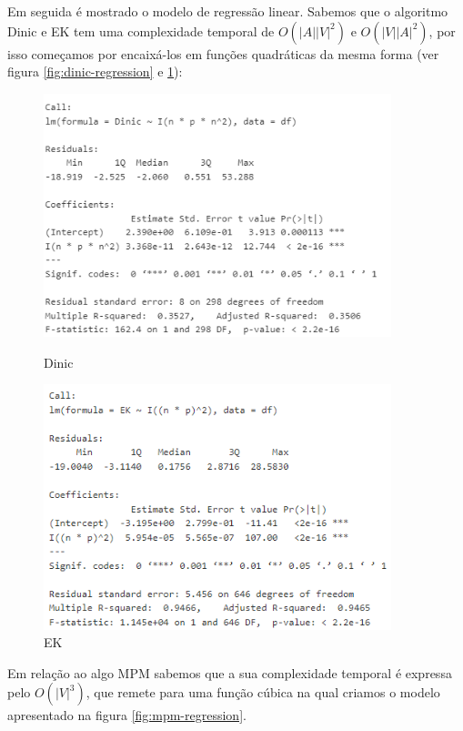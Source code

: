 \documentclass{uofa-eng-assignment}
\begin{document}
Em seguida é mostrado o modelo de regressão linear. Sabemos que o algoritmo Dinic e EK tem uma complexidade temporal de $O(|A||V|^2)$ e $O(|V||A|^2)$, por isso começamos por encaixá-los em funções quadráticas da mesma forma (ver figura \ref{fig:dinic-regression} e \ref{fig:ek-regression}):
\begin{figure}[h]
    \begin{minipage}{0.45\textwidth}
        \centering
        \includegraphics[width=0.9\textwidth]{lm dinic 1.png}
        \caption{Dinic}
        \label{fig:dinic-regression}
    \end{minipage}
    \hfill
    \begin{minipage}{0.45\textwidth}
        \centering
        \includegraphics[width=0.9\textwidth]{lm ek 2.png}
        \caption{EK}
        \label{fig:ek-regression}
    \end{minipage}
\end{figure}

Em relação ao algo MPM sabemos que a sua complexidade temporal é expressa pelo
$O(|V|^3)$, que remete para uma função cúbica na qual criamos o modelo apresentado na figura \ref{fig:mpm-regression}.
\end{document}
